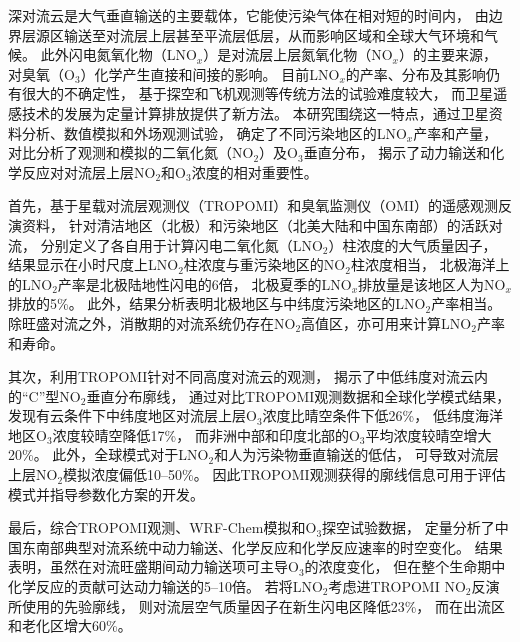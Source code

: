 
\abstract
{
深对流云是大气垂直输送的主要载体，它能使污染气体在相对短的时间内，
由边界层源区输送至对流层上层甚至平流层低层，从而影响区域和全球大气环境和气候。
此外闪电氮氧化物（LNO$_x$）是对流层上层氮氧化物（NO$_x$）的主要来源，
对臭氧（O$_3$）化学产生直接和间接的影响。
目前LNO$_x$的产率、分布及其影响仍有很大的不确定性，
基于探空和飞机观测等传统方法的试验难度较大，
而卫星遥感技术的发展为定量计算排放提供了新方法。
本研究围绕这一特点，通过卫星资料分析、数值模拟和外场观测试验，
确定了不同污染地区的LNO$_x$产率和产量，
对比分析了观测和模拟的二氧化氮（NO$_2$）及O$_3$垂直分布，
揭示了动力输送和化学反应对对流层上层NO$_2$和O$_3$浓度的相对重要性。

首先，基于星载对流层观测仪（TROPOMI）和臭氧监测仪（OMI）的遥感观测反演资料，
针对清洁地区（北极）和污染地区（北美大陆和中国东南部）的活跃对流，
分别定义了各自用于计算闪电二氧化氮（LNO$_2$）柱浓度的大气质量因子，
结果显示在小时尺度上LNO$_2$柱浓度与重污染地区的NO$_2$柱浓度相当，
北极海洋上的LNO$_2$产率是北极陆地性闪电的6倍，
北极夏季的LNO$_x$排放量是该地区人为NO$_x$排放的5\%。
此外，结果分析表明北极地区与中纬度污染地区的LNO$_2$产率相当。
除旺盛对流之外，消散期的对流系统仍存在NO$_2$高值区，亦可用来计算LNO$_2$产率和寿命。

其次，利用TROPOMI针对不同高度对流云的观测，
揭示了中低纬度对流云内的“C”型NO$_2$垂直分布廓线，
通过对比TROPOMI观测数据和全球化学模式结果，
发现有云条件下中纬度地区对流层上层O$_3$浓度比晴空条件下低26\%，
低纬度海洋地区O$_3$浓度较晴空降低17\%，
而非洲中部和印度北部的O$_3$平均浓度较晴空增大20\%。
此外，全球模式对于LNO$_2$和人为污染物垂直输送的低估，
可导致对流层上层NO$_2$模拟浓度偏低10--50\%。
因此TROPOMI观测获得的廓线信息可用于评估模式并指导参数化方案的开发。

最后，综合TROPOMI观测、WRF-Chem模拟和O$_3$探空试验数据，
定量分析了中国东南部典型对流系统中动力输送、化学反应和化学反应速率的时空变化。
结果表明，虽然在对流旺盛期间动力输送项可主导O$_3$的浓度变化，
但在整个生命期中化学反应的贡献可达动力输送的5--10倍。
若将LNO$_2$考虑进TROPOMI NO$_2$反演所使用的先验廓线，
则对流层空气质量因子在新生闪电区降低23\%，
而在出流区和老化区增大60\%。
}
